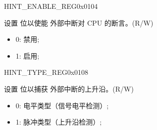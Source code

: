 \begin{register}{H}{INT\_ENABLE\_REG}{0x0104}\label{regdesc:INTENABLEREG}
%
%
%
%
%
%
\regnewline%
\begin{regdesc}
\begin{reglist}
\item [INT\_ENABLE\lbrack\regindex{n}\rbrack] 设置  位以使能  外部中断对 CPU 的断言。(R/W)
\begin{itemize}
    \setlength\itemsep{-1em}
    \item 0: 禁用;
    \item 1: 启用;
\end{itemize}
\end{reglist}
\end{regdesc}
\end{register}

\begin{register}{H}{INT\_TYPE\_REG}{0x0108}\label{regdesc:INTTYPEREG}
%
%
%
%
%
%
\regnewline%
\begin{regdesc}
\begin{reglist}
\item [INT\_TYPE\lbrack\regindex{n}\rbrack] 设置  位以捕获  外部中断的上升沿。(R/W)
\begin{itemize}
    \setlength\itemsep{-1em}
    \item 0: 电平类型（信号电平检测）;
    \item 1: 脉冲类型（上升沿检测）;
\end{itemize}
\end{reglist}
\end{regdesc}
\end{register}

